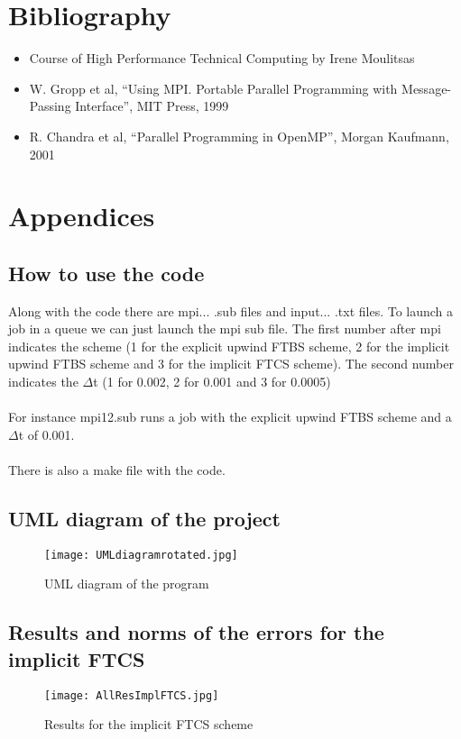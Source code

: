 \documentclass [10 pt, a4 paper]{report}
\begin{document}
\chapter{Bibliography}

\begin{itemize}
    \item Course of High Performance Technical Computing by Irene Moulitsas
    \item W. Gropp et al, “Using MPI. Portable Parallel Programming with Message-Passing Interface”, MIT Press, 1999
    \item R. Chandra et al, “Parallel Programming in OpenMP”, Morgan Kaufmann, 2001
\end{itemize}



\chapter{Appendices}

\section{How to use the code}
Along with the code there are mpi... .sub files and input... .txt files. To launch a job in a queue we can just launch the mpi sub file. 
The first number after mpi indicates the scheme (1 for the explicit upwind FTBS scheme, 2 for the implicit upwind FTBS scheme and 3 for the implicit FTCS scheme).
The second number indicates the $\Delta$t (1 for 0.002, 2 for 0.001 and 3 for 0.0005)
\\ \\
For instance mpi12.sub runs a job with the explicit upwind FTBS scheme and a $\Delta$t of 0.001.
\\ \\
There is also a make file with the code.

\section{UML diagram of the project}
\begin{figure}[!htbp]
\centering
\texttt{[image: UMLdiagramrotated.jpg]}
\caption{\label{fig:image} UML diagram of the program}
\end{figure}

\clearpage
\section{Results and norms of the errors for the implicit FTCS}
\begin{figure}[!htbp]
\centering
\texttt{[image: AllResImplFTCS.jpg]}
\caption{\label{fig:image} Results for the implicit FTCS scheme}
\end{figure}
\end{document}

